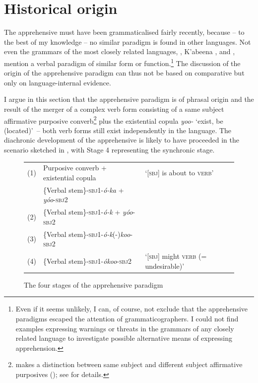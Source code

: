 \documentclass[output=paper,colorlinks,citecolor=brown,]{langscibook}
\begin{document}
\section{Historical origin}\label{sec:treis:5}

The  apprehensive must have been grammaticalised fairly recently, because -- to the best of my knowledge -- no similar paradigm is found in other  languages. Not even the grammars of the most closely related languages,  \citep{Schneider-Blum2007}, K'abeena \citep{Crass2005},  \citep{Tadesse2015} and  \citep{Kawachi2007,Anbessa2014}, mention a verbal paradigm of similar form or function.\footnote{Even if it seems unlikely, I can, of course, not exclude that the apprehensive paradigms escaped the attention of  grammaticographers. I could not find examples expressing warnings or threats in the grammars of any closely related language to investigate possible alternative means of expressing apprehension.} The discussion of the origin of the  apprehensive paradigm can thus not be based on comparative but only on language-internal evidence.

I argue in this section that the apprehensive paradigm is of phrasal origin and the result of the merger of a complex verb form consisting of a same subject affirmative purposive converb\footnote{ makes a distinction between same subject and different subject affirmative purposives (); see \citet{Treis2010} for details.} plus the existential copula \textit{yoo-} `exist, be (located)'~-- both verb forms still exist independently in the language. The diachronic development of the apprehensive is likely to have proceeded in the scenario sketched in , with Stage 4 representing the synchronic stage.

\begin{figure}[ht]
\small%
\begin{tabular}{lll}
(1) & Purposive converb + existential copula & `[\textsc{sbj}] is about to \textsc{verb}'\\
& \{Verbal stem\}-\textsc{sbj1}-\textit{ó-ka} + \textit{yóo}-\textsc{sbj2} &\phantom{a}\\
(2) & \{Verbal stem\}-\textsc{sbj1}-\textit{ó-k} + \textit{yóo}-\textsc{sbj2} & \phantom{a}\\
(3) & \{Verbal stem\}-\textsc{sbj1}-\textit{ó-k}(-)\textit{koo}-\textsc{sbj2}&\phantom{a}\\
(4) & \{Verbal stem\}-\textsc{sbj1}-\textit{ókoo}-\textsc{sbj2} & `[\textsc{sbj}] might \textsc{verb} (= undesirable)'\\ 
\end{tabular}\caption{The four stages of the apprehensive paradigm}
\label{fig:treis:5}\end{figure}
\end{document}
